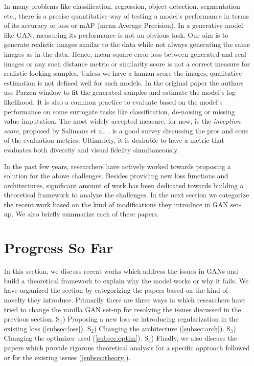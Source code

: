 In many problems like classification, regression, object detection, segmentation etc., there is a precise quantitative way of testing a model's performance in terms of its accuracy or loss or mAP (mean Average Precision). In a generative model like GAN, measuring its performance is not an obvious task. Our aim is to generate realistic images similar to the data while not always generating the same images as in the data. Hence, mean square error loss between generated and real images or any such distance metric or similarity score is not a correct measure for realistic looking samples. Unless we have a human score the images, qualitative estimation is not defined well for such models. In the original paper \citep{ganGoodfellow} the authors use Parzen window to fit the generated samples and estimate the model's log-likelihood. It is also a common practice to evaluate based on the model's performance on some surrogate tasks like classification, de-noising or missing value imputation. The most widely accepted measure, for now, is the \emph{inception score}, proposed by Salimans et al. \citep{goodfellow16}. \citep{proCon} is a good survey discussing the pros and cons of the evaluation metrics. Ultimately, it is desirable to have a metric that evaluates both diversity and visual fidelity simultaneously.


In the past few years, researchers have actively worked towards proposing a solution for the above challenges. Besides providing new loss functions and architectures, significant amount of work has been dedicated towards building a theoretical framework to analyze the challenges. In the next section we categorize the recent work based on the kind of modifications they introduce in GAN set-up. We also briefly summarize each of these papers. 


\section{Progress So Far}
\label{sec:novel}
In this section, we discuss recent works which address the issues in GANs and build a theoretical framework to explain why the model works or why it fails. We have organized the section by categorizing the papers based on the kind of novelty they introduce. Primarily there are three ways in which researchers have tried to change the vanilla GAN set-up for resolving the issues discussed in the previous section. 
S$_1$) Proposing a new loss or introducing regularization in the existing loss (\ref{subsec:loss}). S$_2$) Changing the architecture (\ref{subsec:arch}). S$_3$) Changing the optimizer used (\ref{subsec:optim}). S$_4$) Finally, we also discuss the papers which provide rigorous theoretical analysis for a specific approach followed or for the existing issues (\ref{subsec:theory}).


